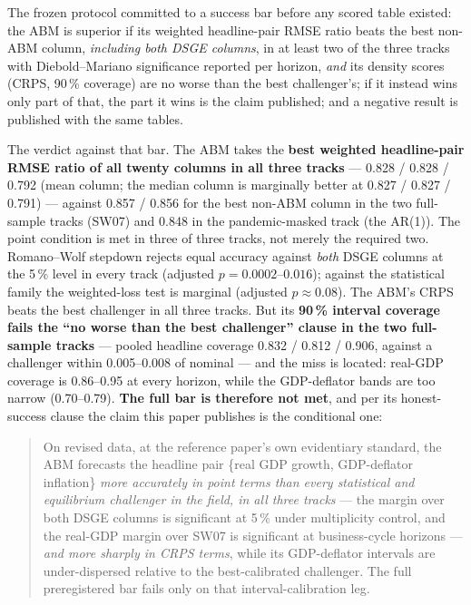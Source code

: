 \documentclass[11pt,a4paper]{article}
\begin{document}
The frozen protocol committed to a success bar before any scored table existed: the ABM is
superior if its weighted headline-pair RMSE ratio beats the best non-ABM column, \emph{including
both DSGE columns}, in at least two of the three tracks with Diebold--Mariano significance
reported per horizon, \emph{and} its density scores (CRPS, 90\,\% coverage) are no worse than the
best challenger's; if it instead wins only part of that, the part it wins is the claim published;
and a negative result is published with the same tables.

The verdict against that bar. The ABM takes the \textbf{best weighted headline-pair RMSE ratio of
all twenty columns in all three tracks} --- 0.828 / 0.828 / 0.792 (mean column; the median column
is marginally better at 0.827 / 0.827 / 0.791) --- against 0.857 / 0.856 for the best non-ABM
column in the two full-sample tracks (SW07) and 0.848 in the pandemic-masked track (the AR(1)).
The point condition is met in three of three tracks, not merely the required two. Romano--Wolf
stepdown rejects equal accuracy against \emph{both} DSGE columns at the 5\,\% level in every track
(adjusted $p = 0.0002$--$0.016$); against the statistical family the weighted-loss test is
marginal (adjusted $p \approx 0.08$). The ABM's CRPS beats the best challenger in all three
tracks. But its \textbf{90\,\% interval coverage fails the ``no worse than the best challenger''
clause in the two full-sample tracks} --- pooled headline coverage 0.832 / 0.812 / 0.906, against
a challenger within 0.005--0.008 of nominal --- and the miss is located: real-GDP coverage is
0.86--0.95 at every horizon, while the GDP-deflator bands are too narrow (0.70--0.79).
\textbf{The full bar is therefore not met}, and per its honest-success clause the claim this paper
publishes is the conditional one:

\begin{quote}
On revised data, at the reference paper's own evidentiary standard, the ABM forecasts the headline
pair \{real GDP growth, GDP-deflator inflation\} \emph{more accurately in point terms than every
statistical and equilibrium challenger in the field, in all three tracks} --- the margin over both
DSGE columns is significant at 5\,\% under multiplicity control, and the real-GDP margin over SW07
is significant at business-cycle horizons --- \emph{and more sharply in CRPS terms}, while its
GDP-deflator intervals are under-dispersed relative to the best-calibrated challenger. The full
preregistered bar fails only on that interval-calibration leg.
\end{quote}
\end{document}
